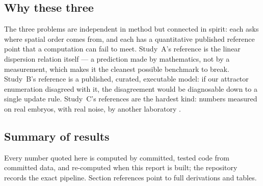 \subsection{Why these three}

The three problems are independent in method but connected in spirit: each
asks where spatial order comes from, and each has a quantitative published
reference point that a computation can fail to meet. Study~A's reference is
the linear dispersion relation itself --- a prediction made by mathematics,
not by a measurement, which makes it the cleanest possible benchmark to break.
Study~B's reference is a published, curated, executable model: if our
attractor enumeration disagreed with it, the disagreement would be
diagnosable down to a single update rule. Study~C's references are the
hardest kind: numbers measured on real embryos, with real noise, by another
laboratory \cite{liu2013,petkova2019,gregor2007}.

\subsection{Summary of results}

Every number quoted here is computed by committed, tested code from committed
data, and re-computed when this report is built; the repository records the
exact pipeline. Section references point to full derivations and tables.

